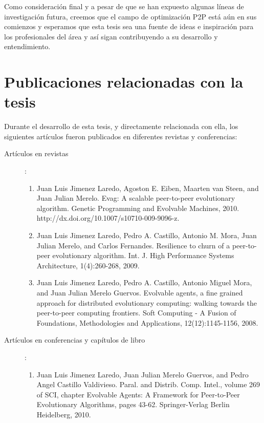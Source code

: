 Como consideraci\'on final y a pesar de que se han expuesto algunas l\'ineas de investigaci\'on futura, creemos que el campo de optimizaci\'on P2P est\'a a\'un en sus comienzos y esperamos que esta tesis sea una fuente de ideas e inspiraci\'on para los profesionales del \'area y as\'i sigan contribuyendo a su desarrollo y entendimiento.

\clearpage    
\section{Publicaciones relacionadas con la tesis}    
    
Durante el desarrollo de esta tesis, y directamente relacionada con ella, los siguientes art\'iculos fueron publicados en diferentes revistas y conferencias:

\begin{description}

\item[Art\'iculos en revistas]:

\begin{enumerate}

\item Juan Luis Jimenez Laredo, Agoston E. Eiben, Maarten van Steen, and Juan Julian Merelo. Evag: A
    scalable peer-to-peer evolutionary algorithm. Genetic Programming and
     Evolvable Machines, 2010. http://dx.doi.org/10.1007/s10710-009-9096-z.

\item Juan Luis Jimenez Laredo, Pedro A. Castillo, Antonio M. Mora, Juan Julian Merelo, and Carlos Fernandes.
    Resilience to churn of a peer-to-peer evolutionary algorithm. Int. J. High Performance Systems Architecture, 1(4):260-268, 2009.


\item Juan Luis Jimenez Laredo, Pedro A. Castillo, Antonio Miguel Mora, and
     Juan Julian Merelo Guervos. Evolvable agents, a fine grained approach for distributed evolutionary computing: walking towards the peer-to-peer computing frontiers. Soft Computing - A Fusion of Foundations,
     Methodologies and Applications, 12(12):1145-1156, 2008.

\end{enumerate}

\item[Art\'iculos en conferencias y cap\'itulos de libro]:

\begin{enumerate}

\item Juan Luis Jimenez Laredo, Juan Julian Merelo Guervos, and Pedro Angel Castillo Valdivieso. Paral. and Distrib. Comp. Intel., volume 269 of SCI, chapter Evolvable Agents: A Framework for Peer-to-Peer Evolutionary Algorithms, pages 43-62. Springer-Verlag Berlin Heidelberg, 2010.



\end{enumerate}
\end{description}
